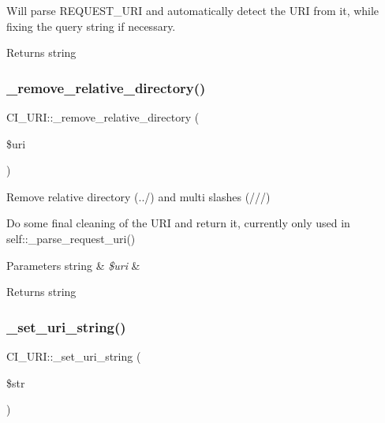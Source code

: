 Will parse R\+E\+Q\+U\+E\+S\+T\+\_\+\+U\+RI and automatically detect the U\+RI from it, while fixing the query string if necessary.

\begin{DoxyReturn}{Returns}
string 
\end{DoxyReturn}
\mbox{\label{class_c_i___u_r_i_a8003a54383ffb2303e59ff5898b1aa88}} 
\subsubsection{\texorpdfstring{\+\_\+remove\+\_\+relative\+\_\+directory()}{\_remove\_relative\_directory()}}
{\footnotesize\ttfamily C\+I\+\_\+\+U\+R\+I\+::\+\_\+remove\+\_\+relative\+\_\+directory (\begin{DoxyParamCaption}\item[{}]{\$uri }\end{DoxyParamCaption})\hspace{0.3cm}{\ttfamily [protected]}}

Remove relative directory (../) and multi slashes (///)

Do some final cleaning of the U\+RI and return it, currently only used in self\+::\+\_\+parse\+\_\+request\+\_\+uri()


\begin{DoxyParams}[1]{Parameters}
string & {\em \$uri} & \\
\hline
\end{DoxyParams}
\begin{DoxyReturn}{Returns}
string 
\end{DoxyReturn}
\mbox{\label{class_c_i___u_r_i_adf23e2984cbd3fc7132ec63f20861820}} 
\subsubsection{\texorpdfstring{\+\_\+set\+\_\+uri\+\_\+string()}{\_set\_uri\_string()}}
{\footnotesize\ttfamily C\+I\+\_\+\+U\+R\+I\+::\+\_\+set\+\_\+uri\+\_\+string (\begin{DoxyParamCaption}\item[{}]{\$str }\end{DoxyParamCaption})\hspace{0.3cm}{\ttfamily [protected]}}

